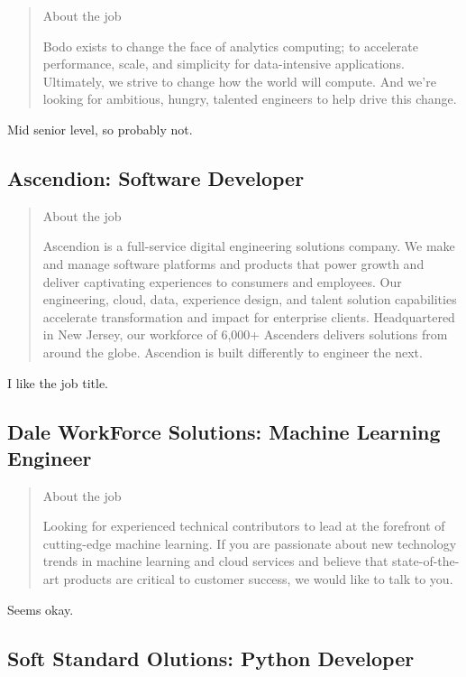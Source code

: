 \documentclass[
	letterpaper, %
	12pt, %
]{CSSullivanBusinessReport}
\begin{document}
\begin{quote}
	About the job
	
	Bodo exists to change the face of analytics computing; to accelerate performance, scale, and simplicity for data-intensive applications. Ultimately, we strive to change how the world will compute. And we’re looking for ambitious, hungry, talented engineers to help drive this change.

\end{quote}

Mid senior level, so probably not. 

\subsection[Ascendion]{Ascendion: Software Developer}

\begin{quote}
	About the job
	
	Ascendion is a full-service digital engineering solutions company. We make and manage software platforms and products that power growth and deliver captivating experiences to consumers and employees. Our engineering, cloud, data, experience design, and talent solution capabilities accelerate transformation and impact for enterprise clients. Headquartered in New Jersey, our workforce of 6,000+ Ascenders delivers solutions from around the globe. Ascendion is built differently to engineer the next.

\end{quote}

I like the job title. 

\subsection[Dale WorkForce Solutions]{Dale WorkForce Solutions: Machine Learning Engineer}

\begin{quote}
	About the job
	
	Looking for experienced technical contributors to lead at the forefront of cutting-edge machine learning. If you are passionate about new technology trends in machine learning and cloud services and believe that state-of-the-art products are critical to customer success, we would like to talk to you. 

\end{quote}

Seems okay.

\subsection[Soft Standard Olutions]{Soft Standard Olutions: Python Developer}
\end{document}
